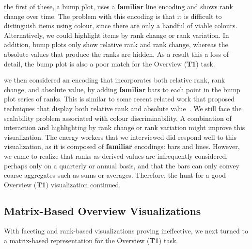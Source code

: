 \documentclass[journal]{vgtc}                %
\newcommand{\bstart}[1]{\vspace{1mm} \noindent{\textbf{#1:}}}
\begin{document}
\bstart{Bump plots} the first of these, a bump plot, uses a {\bf familiar} line encoding and shows rank change over time. 
The problem with this encoding is that it is difficult to distinguish items using colour, since there are only a handful of viable colours. 
Alternatively, we could highlight items by rank change or rank variation.
In addition, bump plots only show relative rank and rank change, whereas the absolute values that produce the ranks are hidden. 
As a result this a loss of detail, the bump plot is also a poor match for the Overview ({\bf T1}) task.

\bstart{Bump + bar plots} we then considered an encoding that incorporates both relative rank, rank change, and absolute value, by adding {\bf familiar} bars to each point in the bump plot series of ranks. 
This is similar to some recent related work that proposed techniques that display both relative rank and absolute value~\cite{Gratzl2013,Hur2013}. 
We still face the scalability problem associated with colour discriminability. 
A combination of interaction and highlighting by rank change or rank variation might improve this visualization.
The energy workers that we interviewed did respond well to this visualization, as it is composed of {\bf familiar} encodings: bars and lines. 
However, we came to realize that ranks as derived values are infrequently considered, perhaps only on a quarterly or annual basis, and that the bars can only convey coarse aggregates such as sums or averages. 
Therefore, the hunt for a good Overview ({\bf T1}) visualization continued.


\subsection{Matrix-Based Overview Visualizations}
\label{design-matrix}



With faceting and rank-based visualizations proving ineffective, we next turned to a matrix-based representation for the Overview ({\bf T1}) task.
\end{document}

